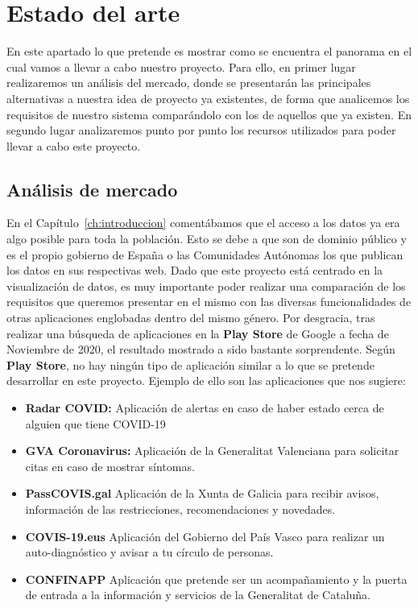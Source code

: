\chapter{Estado del arte} \label{ch:estado_del_arte}

En este apartado lo que pretende es mostrar como se encuentra el panorama en el cual vamos a llevar a cabo nuestro proyecto. Para ello, en primer lugar realizaremos un análisis del mercado, donde se presentarán las principales alternativas a nuestra idea de proyecto ya existentes, de forma que analicemos los requisitos de nuestro sistema comparándolo con los de aquellos que ya existen. En segundo lugar analizaremos punto por punto los recursos utilizados para poder llevar a cabo este proyecto.

\section{Análisis de mercado}

En el Capítulo~\ref{ch:introduccion} comentábamos que el acceso a los datos ya era algo posible para toda la población. Esto se debe a que son de dominio público y es el propio gobierno de España o las Comunidades Autónomas los que publican los datos en sus respectivas web. Dado que este proyecto está centrado en la visualización de datos, es muy importante poder realizar una comparación de los requisitos que queremos presentar en el mismo con las diversas funcionalidades de otras aplicaciones englobadas dentro del mismo género. Por desgracia, tras realizar una búsqueda de aplicaciones en la \textbf{Play Store} de Google a fecha de Noviembre de 2020, el resultado mostrado a sido bastante sorprendente. Según \textbf{Play Store}, no hay ningún tipo de aplicación similar a lo que se pretende desarrollar en este proyecto. Ejemplo de ello son las aplicaciones que nos sugiere:

\begin{itemize}
	\item \textbf{Radar COVID:} Aplicación de alertas en caso de haber estado cerca de alguien que tiene COVID-19
	\item \textbf{GVA Coronavirus:} Aplicación de la Generalitat Valenciana para solicitar citas en caso de mostrar síntomas.
	\item \textbf{PassCOVIS.gal} Aplicación de la Xunta de Galicia para recibir avisos, información de las restricciones, recomendaciones y novedades.
	\item \textbf{COVIS-19.eus} Aplicación del Gobierno del País Vasco para realizar un auto-diagnóstico y avisar a tu círculo de personas.
	\item \textbf{CONFINAPP} Aplicación que pretende ser un acompañamiento y la puerta de entrada a la información y servicios de la Generalitat de Cataluña.
\end{itemize}

